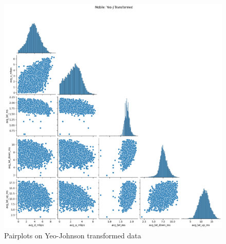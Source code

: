 \documentclass[
  letterpaper,
  DIV=11,
  numbers=noendperiod,
  oneside]{scrartcl}
\begin{document}
\begin{figure}
\begin{minipage}[t]{0.50\linewidth}
{{\includegraphics{data-analytics_files/figure-latex/fig-transpairs-output-2.png}

}

}

\end{minipage}%

\caption{\label{fig-transpairs}Pairplots on Yeo-Johnson transformed
data}

\end{figure}

\hfill\break
\end{document}
